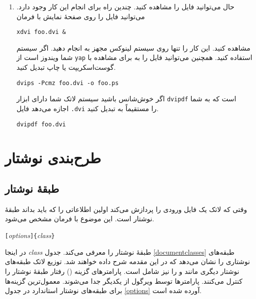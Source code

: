 {\begin{enumerate}
\item 
حال می‌توانید فایل  را مشاهده کنید. چندین راه برای انجام این کار وجود دارد. می‌توانید فایل را روی صفحهٔ نمایش با فرمان
\begin{lscommand}
\verb+xdvi foo.dvi &+
\end{lscommand}
مشاهده کنید. این کار را تنها روی سیستم لینوکس مجهز به  انجام دهید. اگر سیستم شما ویندوز است از \texttt{yap} استفاده کنید. همچنین می‌توانید فایل  را به \PSi{} برای مشاهده با گوست‌اسکریپت یا چاپ تبدیل کنید.
\begin{lscommand}
\verb+dvips -Pcmz foo.dvi -o foo.ps+
\end{lscommand}
اگر خوش‌شانس باشید سیستم لاتک شما دارای ابزار \texttt{dvipdf} است که به شما اجازه می‌دهد فایل \texttt{.dvi} را مستقیماً به  تبدیل کنید.
\begin{lscommand}
\verb+dvipdf foo.dvi+
\end{lscommand}

\end{enumerate}

\section{طرح‌بندی نوشتار}

\subsection{طبقهٔ نوشتار}\label{sec:documentclass}

وقتی که لاتک یک فایل ورودی را پردازش می‌کند اولین اطلاعاتی را که باید بداند طبقهٔ نوشتار است. این موضوع با فرمان
 مشخص می‌شود.


\begin{lscommand}
\verb|[|\emph{options}\verb|]{|\emph{class}\verb|}|
\end{lscommand}
\noindent 
در اینجا 
\emph{class} 
طبقهٔ نوشتار را معرفی می‌کند. جدول
\ref{documentclasses}
طبقه‌های نوشتاری را نشان می‌دهد که در این مقدمه شرح داده خواهند شد.
توزیع لاتک طبقه‌های نوشتار دیگری مانند 
 و  
را نیز شامل است. پارامترهای گزینه 
(\emph{}) 
رفتار طبقهٔ نوشتار را کنترل می‌کنند.
پارامترها توسط ویرگول از یکدیگر جدا می‌شوند. معمول‌ترین گزینه‌ها برای طبقه‌های نوشتار استاندارد در جدول  
\ref{options}
 آورده شده است.

}
